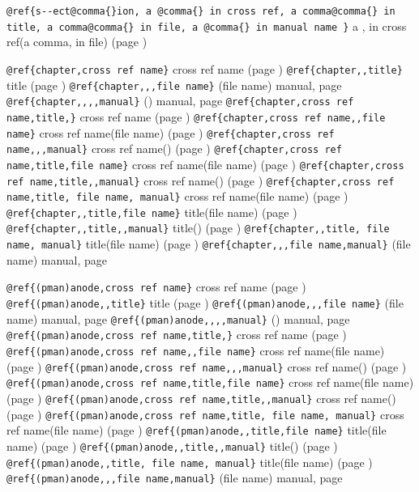 \documentclass{book}
\begin{document}
\texttt{@ref\{s{-}{-}ect@comma\{\}ion, a @comma\{\} in cross
ref, a comma@comma\{\} in title, a comma@comma\{\} in file, a @comma\{\} in manual name \}}
a , in cross
ref(a comma, in file) (page \pageref{anchor:s_002d_002dect_002cion})


\texttt{@ref\{chapter,cross ref name\}} cross ref name (page \pageref{anchor:chapter})
\texttt{@ref\{chapter,,title\}} title (page \pageref{anchor:chapter})
\texttt{@ref\{chapter,,,file name\}} (file name) manual, page \pageref{anchor:chapter}
\texttt{@ref\{chapter,,,,manual\}} () manual, page \pageref{anchor:chapter}
\texttt{@ref\{chapter,cross ref name,title,\}} cross ref name (page \pageref{anchor:chapter})
\texttt{@ref\{chapter,cross ref name,,file name\}} cross ref name(file name) (page \pageref{anchor:chapter})
\texttt{@ref\{chapter,cross ref name,,,manual\}} cross ref name() (page \pageref{anchor:chapter})
\texttt{@ref\{chapter,cross ref name,title,file name\}} cross ref name(file name) (page \pageref{anchor:chapter})
\texttt{@ref\{chapter,cross ref name,title,,manual\}} cross ref name() (page \pageref{anchor:chapter})
\texttt{@ref\{chapter,cross ref name,title, file name, manual\}} cross ref name(file name) (page \pageref{anchor:chapter})
\texttt{@ref\{chapter,,title,file name\}} title(file name) (page \pageref{anchor:chapter})
\texttt{@ref\{chapter,,title,,manual\}} title() (page \pageref{anchor:chapter})
\texttt{@ref\{chapter,,title, file name, manual\}} title(file name) (page \pageref{anchor:chapter})
\texttt{@ref\{chapter,,,file name,manual\}} (file name) manual, page \pageref{anchor:chapter}


\texttt{@ref\{(pman)anode,cross ref name\}} cross ref name (page \pageref{anchor:_0028pman_0029anode})
\texttt{@ref\{(pman)anode,,title\}} title (page \pageref{anchor:_0028pman_0029anode})
\texttt{@ref\{(pman)anode,,,file name\}} (file name) manual, page \pageref{anchor:_0028pman_0029anode}
\texttt{@ref\{(pman)anode,,,,manual\}} () manual, page \pageref{anchor:_0028pman_0029anode}
\texttt{@ref\{(pman)anode,cross ref name,title,\}} cross ref name (page \pageref{anchor:_0028pman_0029anode})
\texttt{@ref\{(pman)anode,cross ref name,,file name\}} cross ref name(file name) (page \pageref{anchor:_0028pman_0029anode})
\texttt{@ref\{(pman)anode,cross ref name,,,manual\}} cross ref name() (page \pageref{anchor:_0028pman_0029anode})
\texttt{@ref\{(pman)anode,cross ref name,title,file name\}} cross ref name(file name) (page \pageref{anchor:_0028pman_0029anode})
\texttt{@ref\{(pman)anode,cross ref name,title,,manual\}} cross ref name() (page \pageref{anchor:_0028pman_0029anode})
\texttt{@ref\{(pman)anode,cross ref name,title, file name, manual\}} cross ref name(file name) (page \pageref{anchor:_0028pman_0029anode})
\texttt{@ref\{(pman)anode,,title,file name\}} title(file name) (page \pageref{anchor:_0028pman_0029anode})
\texttt{@ref\{(pman)anode,,title,,manual\}} title() (page \pageref{anchor:_0028pman_0029anode})
\texttt{@ref\{(pman)anode,,title, file name, manual\}} title(file name) (page \pageref{anchor:_0028pman_0029anode})
\texttt{@ref\{(pman)anode,,,file name,manual\}} (file name) manual, page \pageref{anchor:_0028pman_0029anode}
\end{document}
